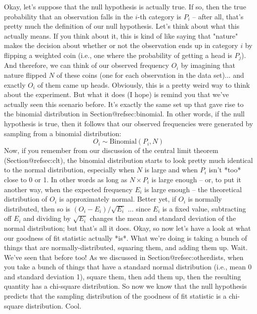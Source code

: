 Okay, let's suppose that the null hypothesis is actually true. If so, then the true probability that an observation falls in the $i$-th category is $P_i$ -- after all, that's pretty much the definition of our null hypothesis. Let's think about what this actually means. If you think about it, this is kind of like saying that "nature" makes the decision about whether or not the observation ends up in category $i$ by flipping a weighted coin (i.e., one where the probability of getting a head is $P_j$). And therefore, we can think of our observed frequency $O_i$ by imagining that nature flipped $N$ of these coins (one for each observation in the data set)... and exactly $O_i$ of them came up heads. Obviously, this is a pretty weird way to think about the experiment. But what it does (I hope) is remind you that we've actually seen this scenario before. It's exactly the same set up that gave rise to the binomial distribution in Section@refsec:binomial. In other words, if the null hypothesis is true, then it follows that our observed frequencies were generated by sampling from a binomial distribution:
$$
O_i \sim \mbox{Binomial}(P_i, N)
$$
Now, if you remember from our discussion of the central limit theorem (Section@refsec:clt), the binomial distribution starts to look pretty much identical to the normal distribution, especially when $N$ is large and when $P_i$ isn't *too* close to 0 or 1. In other words as long as $N \times P_i$ is large enough -- or, to put it another way, when the expected frequency $E_i$ is large enough -- the theoretical distribution of $O_i$ is approximately normal. Better yet, if $O_i$ is normally distributed, then so is $(O_i - E_i)/\sqrt{E_i}$ ... since $E_i$ is a fixed value, subtracting off $E_i$ and dividing by $\sqrt{E_i}$ changes the mean and standard deviation of the normal distribution; but that's all it does. Okay, so now let's have a look at what our goodness of fit statistic actually *is*. What we're doing is taking a bunch of things that are normally-distributed, squaring them, and adding them up. Wait. We've seen that before too! As we discussed in Section@refsec:otherdists, when you take a bunch of things that have a standard normal distribution (i.e., mean 0 and standard deviation 1), square them, then add them up, then the resulting quantity has a chi-square distribution. So now we know that the null hypothesis predicts that the sampling distribution of the goodness of fit statistic is a chi-square distribution. Cool. 

